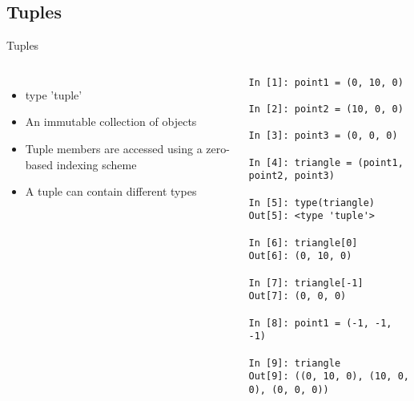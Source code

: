 \documentclass{beamer}
\begin{document}
\subsection{Tuples}
\begin{frame}[fragile]{Tuples}
\begin{columns}[c]
\column{2.5in}
\begin{itemize}
\item{type 'tuple'}
\item{An immutable collection of objects}
\item{Tuple members are accessed using a zero-based indexing scheme}
\item{A tuple can contain different types}
\end{itemize}

\column{2.5in}
\tiny
\begin{lstlisting}
In [1]: point1 = (0, 10, 0)

In [2]: point2 = (10, 0, 0)

In [3]: point3 = (0, 0, 0)

In [4]: triangle = (point1, point2, point3)

In [5]: type(triangle)
Out[5]: <type 'tuple'>

In [6]: triangle[0]
Out[6]: (0, 10, 0)

In [7]: triangle[-1]
Out[7]: (0, 0, 0)

In [8]: point1 = (-1, -1, -1)

In [9]: triangle
Out[9]: ((0, 10, 0), (10, 0, 0), (0, 0, 0))
\end{lstlisting}
\end{columns}
\end{frame}
\end{document}
